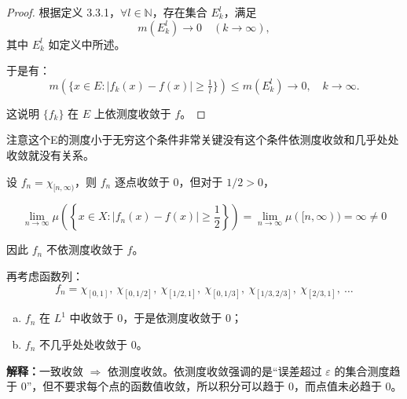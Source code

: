 \documentclass[lang=cn,10pt]{elegantbook}
\begin{document}
\begin{proof}
根据定义 3.3.1，$\forall l \in \mathbb{N}$，存在集合 $E_k^l$，满足
\[
m(E_k^l) \to 0 \quad (k \to \infty),
\]
其中 $E_k^l$ 如定义中所述。

于是有：
\[
m\left(\{x \in E : |f_k(x) - f(x)| \geq \tfrac{1}{l} \} \right) \leq m(E_k^l) \to 0, \quad k \to \infty.
\]

这说明 $\{f_k\}$ 在 $E$ 上依测度收敛于 $f$。
\end{proof}
注意这个E的测度小于无穷这个条件非常关键没有这个条件依测度收敛和几乎处处收敛就没有关系。
\begin{example}[依测度收敛和几乎处处收敛无关]
设 $f_n = \chi_{[n, \infty)}$，则 $f_n$ 逐点收敛于 $0$，但对于 $1/2 > 0$，

\[
\lim_{n \to \infty} \mu\left(\left\{x \in X : |f_n(x) - f(x)| \ge \frac{1}{2} \right\} \right) 
= \lim_{n \to \infty} \mu([n, \infty)) = \infty \ne 0
\]

因此 $f_n$ 不依测度收敛于 $f$。

再考虑函数列：
\[
f_n = \chi_{[0,1]},\ \chi_{[0,1/2]},\ \chi_{[1/2,1]},\ \chi_{[0,1/3]},\ \chi_{[1/3,2/3]},\ \chi_{[2/3,1]},\ \dots
\]

\begin{enumerate}[(a)]
  \item $f_n$ 在 $L^1$ 中收敛于 $0$，于是依测度收敛于 $0$；
  \item $f_n$ 不几乎处处收敛于 $0$。
\end{enumerate}

\textbf{解释：}一致收敛 $\Rightarrow$ 依测度收敛。依测度收敛强调的是“误差超过 $\varepsilon$ 的集合测度趋于 0”，但不要求每个点的函数值收敛，所以积分可以趋于 0，而点值未必趋于 0。
\end{example}
\end{document}
